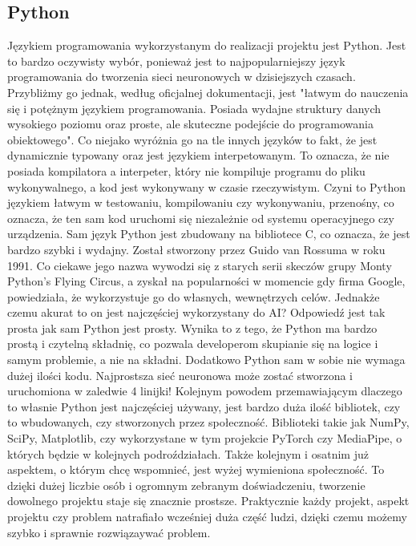 \documentclass[12pt]{article}
\begin{document}
\begin{sloppypar}
{  \subsection{Python}
  {
    Językiem programowania wykorzystanym do realizacji projektu jest Python. 
    Jest to bardzo oczywisty wybór, ponieważ jest to najpopularniejszy język programowania do tworzenia sieci neuronowych w dzisiejszych czasach.
    Przybliżmy go jednak, według oficjalnej dokumentacji, jest "łatwym do nauczenia się i potężnym językiem programowania. 
    Posiada wydajne struktury danych wysokiego poziomu oraz proste, ale skuteczne podejście do programowania obiektowego"\cite{python-docs}.
    Co niejako wyróżnia go na tle innych języków to fakt, że jest dynamicznie typowany oraz jest językiem interpetowanym. 
    To oznacza, że nie posiada kompilatora a interpeter, który nie kompiluje programu do pliku wykonywalnego, a kod jest wykonywany w czasie rzeczywistym.
    Czyni to Python językiem łatwym w testowaniu, kompilowaniu czy wykonywaniu, przenośny, co oznacza, że ten sam kod uruchomi się niezależnie od systemu operacyjnego czy urządzenia.
    Sam język Python jest zbudowany na bibliotece C, co oznacza, że jest bardzo szybki i wydajny. 
    Został stworzony przez Guido van Rossuma w roku 1991.
    Co ciekawe jego nazwa wywodzi się z starych serii skeczów grupy Monty Python’s Flying Circus, 
    a zyskał na popularności w momencie gdy firma Google, powiedziała, że wykorzystuje go do własnych, wewnętrzych celów.
    \newline
    Jednakże czemu akurat to on jest najczęściej wykorzystany do AI? Odpowiedź jest tak prosta jak sam Python jest prosty.
    Wynika to z tego, że Python ma bardzo prostą i czytelną składnię, co pozwala developerom skupianie się na logice i samym problemie, a nie na składni\cite{python-ai}.
    Dodatkowo Python sam w sobie nie wymaga dużej ilości kodu. Najprostsza sieć neuronowa może zostać stworzona i uruchomiona w zaledwie 4 linijki!
    Kolejnym powodem przemawiającym dlaczego to własnie Python jest najczęściej używany, 
    jest bardzo duża ilość bibliotek, czy to wbudowanych, czy stworzonych przez społeczność. 
    Biblioteki takie jak NumPy, SciPy, Matplotlib, czy wykorzystane w tym projekcie PyTorch czy MediaPipe, o których będzie w kolejnych podroździałach.
    Także kolejnym i osatnim już aspektem, o którym chcę wspomnieć, jest wyżej wymieniona społeczność. 
    To dzięki dużej liczbie osób i ogromnym zebranym doświadczeniu, tworzenie dowolnego projektu staje się znacznie prostsze. 
    Praktycznie każdy projekt, aspekt projektu czy problem natrafiało wcześniej duża część ludzi, dzięki czemu możemy szybko i sprawnie rozwiązaywać problem.
  }
}
\end{sloppypar}
\end{document}
